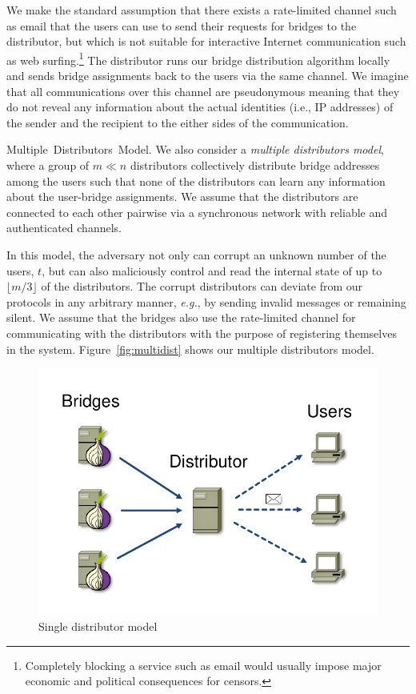 \documentclass[USenglish,oneside,twocolumn]{article}
\newcommand{\fullpaper}[1]{#1}
\newcommand{\fullpaper}[1]{}
\newcommand{\eg}{\textit{e.g.}}
\newcommand{\sfsize}{\fontsize{0.68\baselineskip}{0.68\baselineskip}\selectfont}
\newcommand{\sans}[1]{\textsf{\sfsize \mbox{#1}}}
\newcommand{\para}[1]{\vspace{0.85em} \noindent \sans{{\mbox{#1}}}}
\begin{document}
We make the standard assumption that there exists a rate-limited channel such as email that the users can use to send their requests for bridges to the distributor, but which is not suitable for interactive Internet communication such as web surfing.\footnote{Completely blocking a service such as email would usually impose major economic and political consequences for censors.} The distributor runs our bridge distribution algorithm locally and sends bridge assignments back to the users via the same channel. \fullpaper{We imagine that all communications over this channel are pseudonymous meaning that they do not reveal any information about the actual identities (i.e., IP addresses) of the sender and the recipient to the either sides of the communication.}

\para{Multiple Distributors Model.} 
We also consider a \emph{multiple distributors model}, where a group of \mbox{$m \ll n$} distributors collectively distribute bridge addresses among the users such that none of the distributors can learn any information about the user-bridge assignments. We assume that the distributors are connected to each other pairwise via a synchronous network with reliable and authenticated channels.

In this model, the adversary not only can corrupt an unknown number of the users, $t$, but can also maliciously control and read the internal state of up to $\lfloor m/3 \rfloor$ of the distributors. The corrupt distributors can deviate from our protocols in any arbitrary manner, \eg, by sending invalid messages or remaining silent. 
We assume that the bridges also use the rate-limited channel for communicating with the distributors with the purpose of registering themselves in the system. Figure~\ref{fig:multidist} shows our multiple distributors model.

\begin{figure}[t]
	\centering
	\includegraphics[width=0.7\linewidth]{images/single-alg}
	\caption{Single distributor model}
	\label{fig:singledist}
\end{figure}
\end{document}
